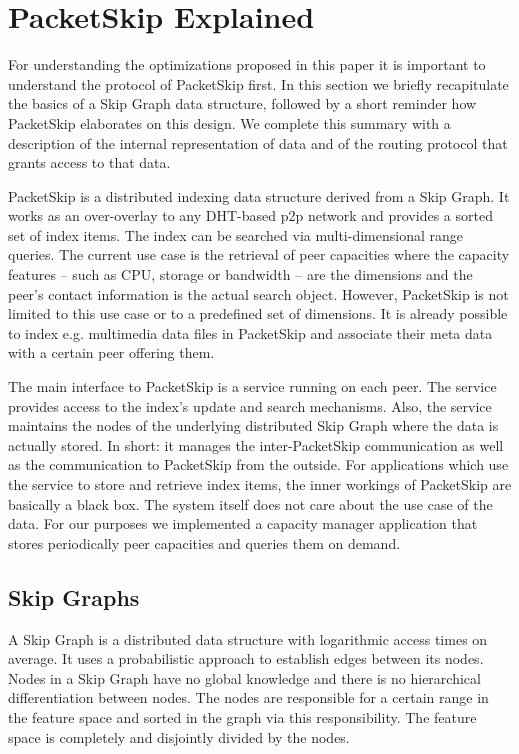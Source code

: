 \section{PacketSkip Explained}
\label{sec:protocol}

For understanding the optimizations proposed in this paper it is important to understand the protocol of PacketSkip first. In this section we briefly recapitulate the basics of a Skip Graph data structure, followed by a short reminder how PacketSkip elaborates on this design. We complete this summary with a description of the internal representation of data and of the routing protocol that grants access to that data.

PacketSkip is a distributed indexing data structure derived from a Skip Graph. It works as an over-overlay to any DHT-based p2p network and provides a sorted set of index items. The index can be searched via multi-dimensional range queries. The current use case is the retrieval of peer capacities where the capacity features -- such as CPU, storage or bandwidth -- are the dimensions and the peer's contact information is the actual search object. However, PacketSkip is not limited to this use case or to a predefined set of dimensions. It is already possible to index e.g. multimedia data files in PacketSkip and associate their meta data with a certain peer offering them.

The main interface to PacketSkip is a service running on each peer. The service provides access to the index's update and search mechanisms. Also, the service maintains the nodes of the underlying distributed Skip Graph where the data is actually stored. In short: it manages the inter-PacketSkip communication as well as the communication to PacketSkip from the outside. For applications which use the service to store and retrieve index items, the inner workings of PacketSkip are basically a black box. The system itself does not care about the use case of the data. For our purposes we implemented a capacity manager application that stores periodically peer capacities and queries them on demand.

\subsection{Skip Graphs}
\label{subsec:skipgraph}

A Skip Graph is a distributed data structure with logarithmic access times on average. It uses a probabilistic approach to establish edges between its nodes. Nodes in a Skip Graph have no global knowledge and there is no hierarchical differentiation between nodes. The nodes are responsible for a certain range in the feature space and sorted in the graph via this responsibility. The feature space is completely and disjointly divided by the nodes.

